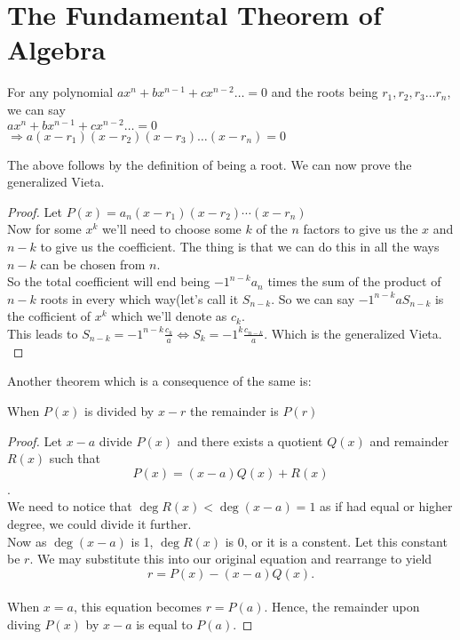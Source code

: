 \section{The Fundamental Theorem of Algebra}
\begin{theorem}
    For any polynomial $ax^n+bx^{n-1}+cx^{n-2}\dots=0$ and the roots being $r_1, r_2, r_3 \dots r_n$, we can say\\
    $ax^n+bx^{n-1}+cx^{n-2}\dots=0$\\
    $\Rightarrow a(x-r_1)(x-r_2)(x-r_3)\dots(x-r_n)=0$
\end{theorem}
The above follows by the definition of being a root. We can now prove the generalized Vieta.\\
\begin{proof}
    Let  $P(x) = a_n (x-r_1)(x-r_2) \cdots (x-r_n)$\\
    Now for some $x^k$ we'll need to choose some $k$ of the $n$ factors to give us the $x$ and $n-k$ to give us the coefficient. The thing is that we can do this in all the ways $n-k$ can be chosen from $n$.\\
    So the total coefficient will end being $-1^{n-k}a_n$ times the sum of the product of $n-k$ roots in every which way(let's call it $S_{n-k}$. So we can say $-1^{n-k}aS_{n-k}$ is the cofficient of $x^k$ which we'll denote as $c_k$.\\
    This leads to $S_{n-k}=-1^{n-k} \frac{c_k}{a} \iff S_k=-1^k \frac{c_{n-k}}{a}$. Which is the generalized Vieta.\\
\end{proof}
Another theorem which is a consequence of the same is:
\begin{theorem}
    When $P(x)$ is divided by $x-r$ the remainder is $P(r)$
\end{theorem}
\begin{proof}
    Let $x-a$ divide $P(x)$ and there exists a quotient $Q(x)$ and remainder $R(x)$ such that\[P(x) = (x-a) Q(x) + R(x)\].\\
    We need to notice that $\deg R(x) < \deg (x-a)=1$ as if had equal or higher degree, we could divide it further. \\
    Now as $\deg (x-a)$ is 1, $\deg R(x)$ is 0, or it is a constent. Let this constant be $r$. We may substitute this into our original equation and rearrange to yield\[r = P(x) - (x-a) Q(x).\]\\
    When $x = a$, this equation becomes $r = P(a)$. Hence, the remainder upon diving $P(x)$ by $x-a$ is equal to $P(a)$.
\end{proof}
